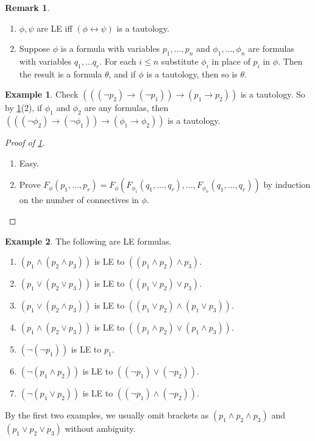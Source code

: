 \documentclass{article}
\newcommand{\rb}[1]{\left( #1 \right)}
\newcommand{\notb}[1]{\rb{\neg #1}}
\newcommand{\orb}[2]{\rb{#1 \lor #2}}
\newcommand{\andb}[2]{\rb{#1 \land #2}}
\newcommand{\impb}[2]{\rb{#1 \rightarrow #2}}
\newcommand{\iffb}[2]{\rb{#1 \leftrightarrow #2}}
\theoremstyle{definition}\newtheorem{definition}{Definition}[subsection]
\theoremstyle{definition}\newtheorem{remark}[definition]{Remark}
\theoremstyle{definition}\newtheorem*{example}{Example}
\theoremstyle{definition}\newtheorem*{note}{Note}
\begin{document}
\begin{remark}
\hfill
\label{rem:1.1.5}
\begin{enumerate}
\item $ \phi, \psi $ are LE iff $ \iffb{\phi}{\psi} $ is a tautology.
\item Suppose $ \phi $ is a formula with variables $ p_1, \dots, p_n $ and $ \phi_1, \dots, \phi_n $ are formulas with variables $ q_1, \dots q_r $. For each $ i \le n $ substitute $ \phi_i $ in place of $ p_i $ in $ \phi $. Then the result is a formula $ \theta $, and if $ \phi $ is a tautology, then so is $ \theta $.
\end{enumerate}
\end{remark}

\begin{example}
Check $ \impb{\impb{\notb{p_2}}{\notb{p_1}}}{\impb{p_1}{p_2}} $ is a tautology. So by \ref{rem:1.1.5}(2), if $ \phi_1 $ and $ \phi_2 $ are any formulas, then $ \impb{\impb{\notb{\phi_2}}{\notb{\phi_1}}}{\impb{\phi_1}{\phi_2}} $ is a tautology.
\end{example}

\begin{proof}[Proof of \ref{rem:1.1.5}]
\hfill
\begin{enumerate}
\item Easy.
\item Prove $ F_\phi\rb{p_1, \dots, p_r} = F_\phi\rb{F_{\phi_1}\rb{q_1, \dots, q_r}, \dots, F_{\phi_n}\rb{q_1, \dots, q_r}} $ by induction on the number of connectives in $ \phi $.
\end{enumerate}
\end{proof}

\begin{example}
The following are LE formulas.
\begin{enumerate}
\item $ \andb{p_1}{\andb{p_2}{p_3}} $ is LE to $ \andb{\andb{p_1}{p_2}}{p_3} $.
\item $ \orb{p_1}{\orb{p_2}{p_3}} $ is LE to $ \orb{\orb{p_1}{p_2}}{p_3} $.
\item $ \orb{p_1}{\andb{p_2}{p_3}} $ is LE to $ \andb{\orb{p_1}{p_2}}{\orb{p_1}{p_3}} $.
\item $ \andb{p_1}{\orb{p_2}{p_3}} $ is LE to $ \orb{\andb{p_1}{p_2}}{\andb{p_1}{p_3}} $.
\item $ \notb{\notb{p_1}} $ is LE to $ p_1 $.
\item $ \notb{\andb{p_1}{p_2}} $ is LE to $ \orb{\notb{p_1}}{\notb{p_2}} $.
\item $ \notb{\orb{p_1}{p_2}} $ is LE to $ \andb{\notb{p_1}}{\notb{p_2}} $.
\end{enumerate}
By the first two examples, we usually omit brackets as $ \rb{p_1 \land p_2 \land p_3} $ and $ \rb{p_1 \lor p_2 \lor p_3} $ without ambiguity.
\end{example}
\end{document}
